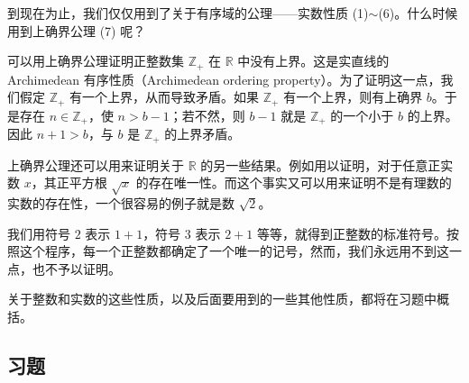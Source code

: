 \documentclass[../../main.tex]{subfiles}
\begin{document}
到现在为止，我们仅仅用到了关于有序域的公理——实数性质 (1)$\sim$(6)。什么时候用到上确界公理 (7) 呢？

可以用上确界公理证明正整数集 $\mathbb{Z}_{+}$ 在 $\mathbb{R}$ 中没有上界。这是实直线的 Archimedean 有序性质（Archimedean ordering property）。为了证明这一点，我们假定 $\mathbb{Z}_{+}$ 有一个上界，从而导致矛盾。如果 $\mathbb{Z}_{+}$ 有一个上界，则有上确界 $b$。于是存在 $n \in \mathbb{Z}_{+}$，使 $n > b - 1$；若不然，则 $b - 1$ 就是 $\mathbb{Z}_{+}$ 的一个小于 $b$ 的上界。因此 $n + 1 > b$，与 $b$ 是 $\mathbb{Z}_{+}$ 的上界矛盾。

上确界公理还可以用来证明关于 $\mathbb{R}$ 的另一些结果。例如用以证明，对于任意正实数 $x$，其正平方根 $\sqrt{x}$ 的存在唯一性。而这个事实又可以用来证明不是有理数的实数的存在性，一个很容易的例子就是数 $\sqrt{2}$。

我们用符号 $2$ 表示 $1 + 1$，符号 $3$ 表示 $2 + 1$ 等等，就得到正整数的标准符号。按照这个程序，每一个正整数都确定了一个唯一的记号，然而，我们永远用不到这一点，也不予以证明。

关于整数和实数的这些性质，以及后面要用到的一些其他性质，都将在习题中概括。

\subsection*{习题}
\end{document}
